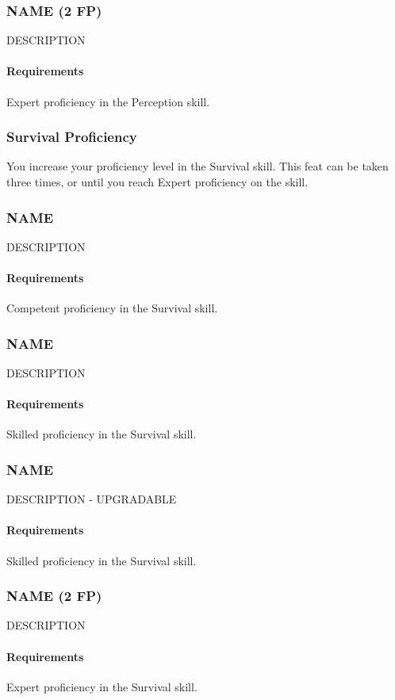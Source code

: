 \subsubsection{NAME (2 FP)} \label{feat::name}
    DESCRIPTION
    \paragraph{Requirements} Expert proficiency in the Perception skill.
\subsubsection{Survival Proficiency} \label{feat::survivalprof}
    You increase your proficiency level in the Survival skill.
    This feat can be taken three times, or until you reach Expert proficiency on the skill.
\subsubsection{NAME} \label{feat::name}
    DESCRIPTION
    \paragraph{Requirements} Competent proficiency in the Survival skill.
\subsubsection{NAME} \label{feat::name}
    DESCRIPTION
    \paragraph{Requirements} Skilled proficiency in the Survival skill.
\subsubsection{NAME} \label{feat::name}
    DESCRIPTION - UPGRADABLE
    \paragraph{Requirements} Skilled proficiency in the Survival skill.
\subsubsection{NAME (2 FP)} \label{feat::name}
    DESCRIPTION
    \paragraph{Requirements} Expert proficiency in the Survival skill.
